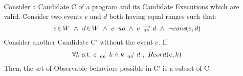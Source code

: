 \begin{corollary}
    \label{CorolWriteElim}
    Consider a Candidate C of a program and its Candidate Executions which are valid. Consider two events $e$ and $d$ both having equal ranges such that:
    \begin{align*}
        \event{e}{W} \ \wedge \ \event{d}{W} \ \wedge \ \et{e}{uo} \ \wedge \ \reln{e}{ao}{d} \ \wedge \ \neg\cons{e}{d}
    \end{align*} 
    Consider another Candidate C' without the event $e$. If
    \begin{align*}
        \forall k \ \text{s.t.} \ e\stackrel{\longrightarrow}{_{ao}}k \wedge k\stackrel{\longrightarrow}{_{ao}}d \ , \
        Reord(e, k)
    \end{align*}
    Then, the set of Observable behaviors possible in C' is a subset of C.
\end{corollary}

